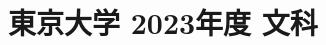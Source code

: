 ﻿\documentclass[../../uem_tok_q.tex]{subfiles}
\begin{document}
    \section{東京大学 2023年度 文科}
    \subsection{　}
    
    \vfill
    \subsection{　}
    
    \vfill
    \newpage
    \subsection{　}
    
    \vfill
    \subsection{　}
    
    \vfill
\end{document}
